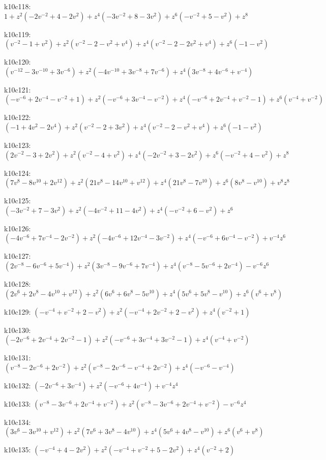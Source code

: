 k10c118: $ 1  +z^{2}(-2v^{-2}+4-2v^{2})  +z^{4}(-3v^{-2}+8-3v^{2})  +z^{6}(-v^{-2}+5-v^{2})  +z^{8} $ 

k10c119: $ (v^{-2}-1+v^{2})  +z^{2}(v^{-2}-2-v^{2}+v^{4})  +z^{4}(v^{-2}-2-2v^{2}+v^{4})  +z^{6}(-1-v^{2}) $ 

k10c120: $ (v^{-12}-3v^{-10}+3v^{-6})  +z^{2}(-4v^{-10}+3v^{-8}+7v^{-6})  +z^{4}(3v^{-8}+4v^{-6}+v^{-4}) $ 

k10c121: $ (-v^{-6}+2v^{-4}-v^{-2}+1)  +z^{2}(-v^{-6}+3v^{-4}-v^{-2})  +z^{4}(-v^{-6}+2v^{-4}+v^{-2}-1)  +z^{6}(v^{-4}+v^{-2}) $ 

k10c122: $ (-1+4v^{2}-2v^{4})  +z^{2}(v^{-2}-2+3v^{2})  +z^{4}(v^{-2}-2-v^{2}+v^{4})  +z^{6}(-1-v^{2}) $ 

k10c123: $ (2v^{-2}-3+2v^{2})  +z^{2}(v^{-2}-4+v^{2})  +z^{4}(-2v^{-2}+3-2v^{2})  +z^{6}(-v^{-2}+4-v^{2})  +z^{8} $ 

k10c124: $ (7v^{8}-8v^{10}+2v^{12})  +z^{2}(21v^{8}-14v^{10}+v^{12})  +z^{4}(21v^{8}-7v^{10})  +z^{6}(8v^{8}-v^{10})  +v^{8}z^{8} $ 

k10c125: $ (-3v^{-2}+7-3v^{2})  +z^{2}(-4v^{-2}+11-4v^{2})  +z^{4}(-v^{-2}+6-v^{2})  +z^{6} $ 

k10c126: $ (-4v^{-6}+7v^{-4}-2v^{-2})  +z^{2}(-4v^{-6}+12v^{-4}-3v^{-2})  +z^{4}(-v^{-6}+6v^{-4}-v^{-2})  +v^{-4}z^{6} $ 

k10c127: $ (2v^{-8}-6v^{-6}+5v^{-4})  +z^{2}(3v^{-8}-9v^{-6}+7v^{-4})  +z^{4}(v^{-8}-5v^{-6}+2v^{-4})  -v^{-6}z^{6} $ 

k10c128: $ (2v^{6}+2v^{8}-4v^{10}+v^{12})  +z^{2}(6v^{6}+6v^{8}-5v^{10})  +z^{4}(5v^{6}+5v^{8}-v^{10})  +z^{6}(v^{6}+v^{8}) $ 

k10c129: $ (-v^{-4}+v^{-2}+2-v^{2})  +z^{2}(-v^{-4}+2v^{-2}+2-v^{2})  +z^{4}(v^{-2}+1) $ 

k10c130: $ (-2v^{-6}+2v^{-4}+2v^{-2}-1)  +z^{2}(-v^{-6}+3v^{-4}+3v^{-2}-1)  +z^{4}(v^{-4}+v^{-2}) $ 

k10c131: $ (v^{-8}-2v^{-6}+2v^{-2})  +z^{2}(v^{-8}-2v^{-6}-v^{-4}+2v^{-2})  +z^{4}(-v^{-6}-v^{-4}) $ 

k10c132: $ (-2v^{-6}+3v^{-4})  +z^{2}(-v^{-6}+4v^{-4})  +v^{-4}z^{4} $ 

k10c133: $ (v^{-8}-3v^{-6}+2v^{-4}+v^{-2})  +z^{2}(v^{-8}-3v^{-6}+2v^{-4}+v^{-2})  -v^{-6}z^{4} $ 

k10c134: $ (3v^{6}-3v^{10}+v^{12})  +z^{2}(7v^{6}+3v^{8}-4v^{10})  +z^{4}(5v^{6}+4v^{8}-v^{10})  +z^{6}(v^{6}+v^{8}) $ 

k10c135: $ (-v^{-4}+4-2v^{2})  +z^{2}(-v^{-4}+v^{-2}+5-2v^{2})  +z^{4}(v^{-2}+2) $ 

